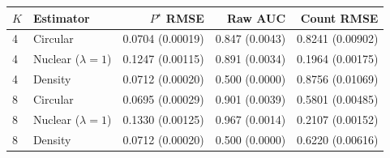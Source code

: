 \begin{tabular}{llrrr}
\toprule
$K$ & Estimator & $P^\star$ RMSE & Raw AUC & Count RMSE \\
\midrule
4 & Circular & 0.0704 (0.00019) & 0.847 (0.0043) & 0.8241 (0.00902) \\
4 & Nuclear ($\lambda=1$) & 0.1247 (0.00115) & 0.891 (0.0034) & 0.1964 (0.00175) \\
4 & Density & 0.0712 (0.00020) & 0.500 (0.0000) & 0.8756 (0.01069) \\
\midrule
8 & Circular & 0.0695 (0.00029) & 0.901 (0.0039) & 0.5801 (0.00485) \\
8 & Nuclear ($\lambda=1$) & 0.1330 (0.00125) & 0.967 (0.0014) & 0.2107 (0.00152) \\
8 & Density & 0.0712 (0.00020) & 0.500 (0.0000) & 0.6220 (0.00616) \\
\bottomrule
\end{tabular}
